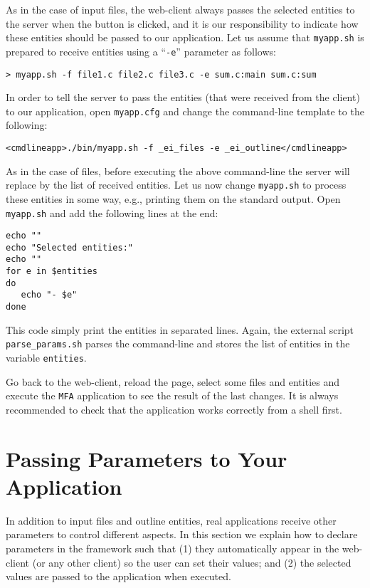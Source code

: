 As in the case of input files, the web-client always passes the
selected entities to the server when the \applybutton button is
clicked, and it is our responsibility to indicate how these entities
should be passed to our application. 
%
Let us assume that \texttt{myapp.sh} is prepared to receive entities
using a ``\texttt{-e}'' parameter as follows:

\medskip
\begin{lstlisting}
> myapp.sh -f file1.c file2.c file3.c -e sum.c:main sum.c:sum
\end{lstlisting}

\medskip 
\noindent
In order to tell the server to pass the entities (that were received
from the client) to our application, open \texttt{myapp.cfg} and
change the command-line template to the following:

\medskip
\begin{lstlisting}
<cmdlineapp>./bin/myapp.sh -f _ei_files -e _ei_outline</cmdlineapp>
\end{lstlisting}

\medskip
\noindent
As in the case of files, before executing the above command-line the
server will replace  by the list of received
entities.  Let us now change \texttt{myapp.sh} to process these
entities in some way, e.g., printing them on the standard output. Open
\texttt{myapp.sh} and add the following lines at the end:

\medskip
\begin{lstlisting}[style=script]
echo ""
echo "Selected entities:"
echo ""
for e in $entities 
do
   echo "- $e"
done
\end{lstlisting}

\medskip
\noindent
This code simply print the entities in separated lines. Again, the
external script \texttt{parse\_params.sh} parses the command-line and
stores the list of entities in the variable \texttt{entities}.

Go back to the web-client, reload the page, select some files and
entities and execute the \texttt{MFA} application to see the result of
the last changes. It is always recommended to check that the
application works correctly from a shell first.

\section{Passing Parameters to Your Application}

In addition to input files and outline entities, real applications
receive other parameters to control different aspects. In this section
we explain how to declare parameters in the \ei framework such that
(1) they automatically appear in the web-client (or any other client)
so the user can set their values; and (2) the selected values are
passed to the application when executed.

